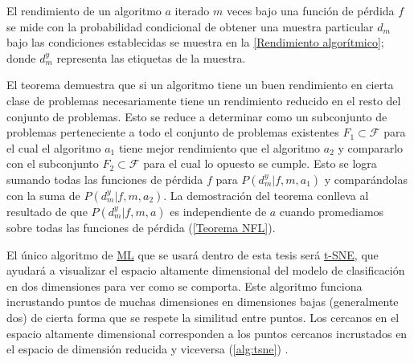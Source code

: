 El rendimiento de un algoritmo $a$ iterado $m$ veces bajo una función de pérdida
$f$ se mide con la probabilidad condicional de obtener una muestra particular
$d_{m}$ bajo las condiciones establecidas se muestra en la \autoref{Rendimiento
algorítmico}; donde $d^{y}_{m}$ representa las etiquetas de la muestra. 


El teorema demuestra que si un algoritmo tiene un buen rendimiento en cierta
clase de problemas necesariamente tiene un rendimiento reducido en el resto
del conjunto de problemas. Esto se reduce a determinar como un subconjunto de
problemas perteneciente a todo el conjunto de problemas existentes $F_{1}
\subset \mathcal{F}$ para el cual el algoritmo $a_{1}$ tiene mejor rendimiento
que el algoritmo $a_{2}$ y compararlo con el subconjunto $F_{2} \subset
\mathcal{F}$ para el cual lo opuesto se cumple. Esto se logra sumando todas las
funciones de pérdida $f$ para $P(d^{y}_{m} | f, m ,a_{1})$ y comparándolas con
la suma de $P(d^{y}_{m} | f, m ,a_{2})$. La demostración del teorema conlleva al
resultado de que $P(d^{y}_{m} | f, m ,a)$ es independiente de $a$ cuando
promediamos sobre todas las funciones de pérdida (\autoref{Teorema
NFL})\cite{Wolpert1996}.


El único algoritmo de \hyperlink{abbr}{ML} que se usará dentro de esta tesis
será \hyperlink{abbr}{t-SNE}, que ayudará a visualizar el espacio altamente
dimensional del modelo de clasificación en dos dimensiones para ver como se
comporta. Este algoritmo funciona incrustando puntos de muchas dimensiones en
dimensiones bajas (generalmente dos) de cierta forma que se respete la similitud
entre puntos. Los cercanos en el espacio altamente dimensional corresponden a
los puntos cercanos incrustados en el espacio de dimensión reducida y viceversa
(\autoref{alg:tsne}) \cite{VanderMaaten2008}\cite{VanderMaaten2013}.


